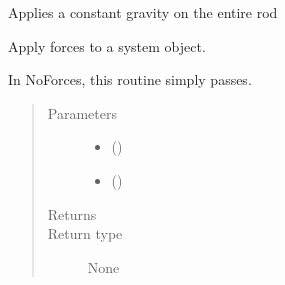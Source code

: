 \documentclass[letterpaper,10pt,english]{sphinxmanual}
\begin{document}
\begin{fulllineitems}
\label{\detokenize{documentation:elastica.external_forces.GravityForces}}
Applies a constant gravity on the entire rod

\begin{fulllineitems}
\label{\detokenize{documentation:elastica.external_forces.GravityForces.apply_forces}}
Apply forces to a system object.

In NoForces, this routine simply passes.
\begin{quote}\begin{description}
\item[{Parameters}] \leavevmode\begin{itemize}
\item {} 
 () \textendash{} 

\item {} 
 (\sphinxstyleliteralemphasis{\sphinxupquote{, }}) \textendash{} 

\end{itemize}

\item[{Returns}] \leavevmode


\item[{Return type}] \leavevmode
None

\end{description}\end{quote}

\end{fulllineitems}


\end{fulllineitems}

\end{document}
